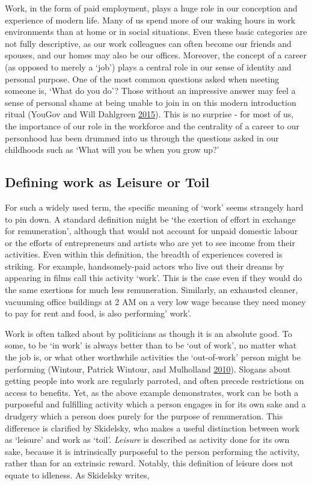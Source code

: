 \documentclass[]{tufte-handout}
\begin{document}
Work, in the form of paid employment, plays a huge role in our
conception and experience of modern life. Many of us spend more of our
waking hours in work environments than at home or in social situations.
Even these basic categories are not fully descriptive, as our work
colleagues can often become our friends and spouses, and our homes may
also be our offices. Moreover, the concept of a career (as opposed to
merely a `job') plays a central role in our sense of identity and
personal purpose. One of the most common questions asked when meeting
someone is, `What do you do'? Those without an impressive answer may
feel a sense of personal shame at being unable to join in on this modern
introduction ritual (YouGov and Will Dahlgreen
\protect\hyperlink{ref-YouGov2015}{2015}). This is no surprise - for
most of us, the importance of our role in the workforce and the
centrality of a career to our personhood has been drummed into us
through the questions asked in our childhoods such as `What will you be
when you grow up?'

\hypertarget{defining-work-as-leisure-or-toil}{%
\subsection{Defining work as Leisure or
Toil}\label{defining-work-as-leisure-or-toil}}

For such a widely used term, the specific meaning of `work' seems
strangely hard to pin down. A standard definition might be `the exertion
of effort in exchange for remuneration', although that would not account
for unpaid domestic labour or the efforts of entrepreneurs and artists
who are yet to see income from their activities. Even within this
definition, the breadth of experiences covered is striking. For example,
handsomely-paid actors who live out their dreams by appearing in films
call this activity `work'. This is the case even if they would do the
same exertions for much less remuneration. Similarly, an exhausted
cleaner, vacuuming office buildings at 2 AM on a very low wage because
they need money to pay for rent and food, is also performing' work'.

Work is often talked about by politicians as though it is an absolute
good. To some, to be `in work' is always better than to be `out of
work', no matter what the job is, or what other worthwhile activities
the `out-of-work' person might be performing (Wintour, Patrick Wintour,
and Mulholland \protect\hyperlink{ref-PatrickWintour2010}{2010}).
Slogans about getting people into work are regularly parroted, and often
precede restrictions on access to benefits. Yet, as the above example
demonstrates, work can be both a purposeful and fulfilling activity
which a person engages in for its own sake and a drudgery which a person
does purely for the purpose of remuneration. This difference is
clarified by Skidelsky, who makes a useful distinction between work as
`leisure' and work as `toil'. \emph{Leisure} is described as activity
done for its own sake, because it is intrinsically purposeful to the
person performing the activity, rather than for an extrinsic reward.
Notably, this definition of leisure does not equate to idleness. As
Skidelsky writes,
\end{document}

